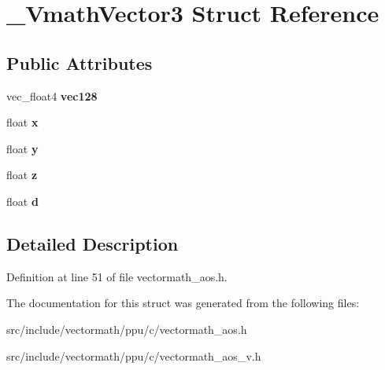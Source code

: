 \hypertarget{struct__VmathVector3}{\section{\-\_\-\-Vmath\-Vector3 Struct Reference}
\label{struct__VmathVector3}
}
\subsection*{Public Attributes}
\begin{DoxyCompactItemize}
\item 
\hypertarget{struct__VmathVector3_ad49d2e07b5d3f8603b8a508e648d9520}{vec\-\_\-float4 {\bfseries vec128}}\label{struct__VmathVector3_ad49d2e07b5d3f8603b8a508e648d9520}

\item 
\hypertarget{struct__VmathVector3_a8fe5c01803334b5805e531519bd540d5}{float {\bfseries x}}\label{struct__VmathVector3_a8fe5c01803334b5805e531519bd540d5}

\item 
\hypertarget{struct__VmathVector3_afceb85bf7b65e2205c6f834dca89565d}{float {\bfseries y}}\label{struct__VmathVector3_afceb85bf7b65e2205c6f834dca89565d}

\item 
\hypertarget{struct__VmathVector3_a15ede43efa34ba55f13913acf25595c2}{float {\bfseries z}}\label{struct__VmathVector3_a15ede43efa34ba55f13913acf25595c2}

\item 
\hypertarget{struct__VmathVector3_ab613d4e620bfa29e1df587c3d1f82ed7}{float {\bfseries d}}\label{struct__VmathVector3_ab613d4e620bfa29e1df587c3d1f82ed7}

\end{DoxyCompactItemize}


\subsection{Detailed Description}


Definition at line 51 of file vectormath\-\_\-aos.\-h.



The documentation for this struct was generated from the following files\-:\begin{DoxyCompactItemize}
\item 
src/include/vectormath/ppu/c/vectormath\-\_\-aos.\-h\item 
src/include/vectormath/ppu/c/vectormath\-\_\-aos\-\_\-v.\-h\end{DoxyCompactItemize}
